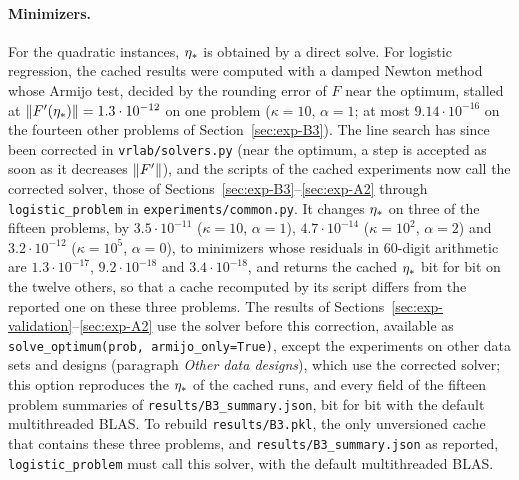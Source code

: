 \paragraph{Minimizers.}
For the quadratic instances, $\eta_\ast$ is obtained by a direct solve. For logistic regression, the cached results were
computed with a damped Newton method whose Armijo test, decided by the rounding error of $F$ near the optimum, stalled at
$\left\|F'(\eta_\ast)\right\|=1.3\cdot10^{-12}$ on one problem ($\kappa=10$, $\alpha=1$; at most $9.14\cdot10^{-16}$ on the
fourteen other problems of Section~\ref{sec:exp-B3}). The line search has since been corrected in
\nolinkurl{vrlab/solvers.py} (near the optimum, a step is accepted as soon as it decreases $\left\|F'\right\|$), and the scripts
of the cached experiments now call the corrected solver, those of Sections~\ref{sec:exp-B3}--\ref{sec:exp-A2} through
\texttt{logistic\_problem} in \nolinkurl{experiments/common.py}. It changes $\eta_\ast$ on three of the fifteen problems,
by $3.5\cdot10^{-11}$ ($\kappa=10$, $\alpha=1$), $4.7\cdot10^{-14}$ ($\kappa=10^2$, $\alpha=2$) and $3.2\cdot10^{-12}$
($\kappa=10^5$, $\alpha=0$), to minimizers whose residuals in 60-digit arithmetic are $1.3\cdot10^{-17}$,
$9.2\cdot10^{-18}$ and $3.4\cdot10^{-18}$, and returns the cached $\eta_\ast$ bit for bit on the twelve others, so that a
cache recomputed by its script differs from the reported one on these three problems. The results of
Sections~\ref{sec:exp-validation}--\ref{sec:exp-A2} use the solver before this correction, available as
\texttt{solve\_optimum(prob, armijo\_only=True)}, except the experiments on other data sets and designs (paragraph
\emph{Other data designs}), which use the corrected solver; this option reproduces the $\eta_\ast$ of the cached runs,
and every field of the fifteen problem summaries of \nolinkurl{results/B3_summary.json}, bit for bit with the default
multithreaded BLAS. To rebuild \nolinkurl{results/B3.pkl}, the only unversioned cache that contains these three
problems, and \nolinkurl{results/B3_summary.json} as reported, \texttt{logistic\_problem} must call this solver, with the
default multithreaded BLAS.

